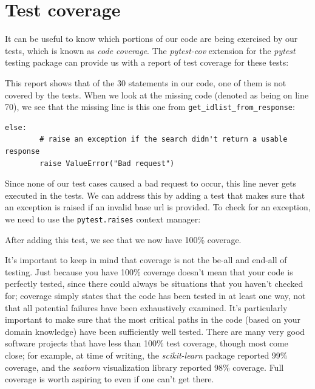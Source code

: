\section{Test coverage}

It can be useful to know which portions of our code are being exercised by our tests, which is known as \textit{code coverage}.
The \textit{pytest-cov} extension for the \textit{pytest} testing package can provide us with a report of test coverage for these tests:



This report shows that of the 30 statements in our code, one of them is not covered by the tests.
When we look at the missing code (denoted as being on line 70), we see that the missing line is this one from \texttt{get\_idlist\_from\_response}:

\begin{lstlisting}[style=Pythonshort]
else:
        # raise an exception if the search didn't return a usable response
        raise ValueError("Bad request")
\end{lstlisting}

Since none of our test cases caused a bad request to occur, this line never gets executed in the tests.
We can address this by adding a test that makes sure that an exception is raised if an invalid base url is provided.
To check for an exception, we need to use the \texttt{pytest.raises} context manager:



After adding this test, we see that we now have 100\% coverage.

It's important to keep in mind that coverage is not the be-all and end-all of testing.  
Just because you have 100\% coverage doesn't mean that your code is perfectly tested, since there could always be situations that you haven't checked for; coverage simply states that the code has been tested in at least one way, not that all potential failures have been exhaustively examined.
It's particularly important to make sure that the most critical paths in the code (based on your domain knowledge) have been sufficiently well tested.
There are many very good software projects that have less than 100\% test coverage, though most come close; for example, at time of writing, the \textit{scikit-learn} package reported 99\% coverage, and the \textit{seaborn} visualization library reported 98\% coverage.  Full coverage is worth aspiring to even if one can't get there.

